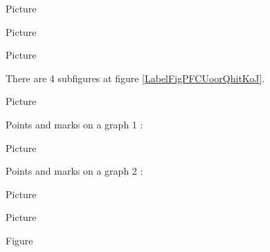 \clearpage

Picture 
\begin{center}

\end{center}


Picture 
\begin{center}
   
\end{center}
   


   Picture 
\begin{center}

\end{center}




\clearpage

There are 4 subfigures at figure \ref{LabelFigPFCUoorQhitKoJ}. %
\newcommand{\CaptionFigPFCUoorQhitKoJ}{4 subfigures still to be descripted.}



\clearpage


Picture 
\begin{center}

\end{center}



Points and marks on a graph 1 :

Picture 
\begin{center}

\end{center}


Points and marks on a graph 2 :

Picture 
\begin{center}

\end{center}


Picture 
\begin{center}

\end{center}



Figure 
\begin{center}

\end{center}

